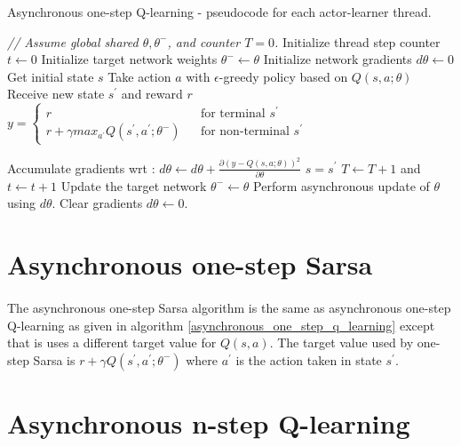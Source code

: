 \documentclass[12pt,a4paper]{article}
\begin{document}
\begin{algorithm} 
	\caption{Asynchronous one-step Q-learning - pseudocode for each actor-learner thread.}
	\label{asynchronous_one_step_q_learning}
	\begin{algorithmic}[1]
		\State \textit{// Assume global shared $\theta, \theta^{-}$, and counter $T = 0$.}
		\State Initialize thread step counter $t \leftarrow 0$
		\State Initialize target network weights $\theta^{-} \leftarrow \theta$
		\State Initialize network gradients $d\theta \leftarrow 0$
		\State Get initial state $s$
		\Repeat
			\State Take action $a$ with $\epsilon$-greedy policy based on $Q(s, a; \theta)$
			\State Receive new state $s^{'}$ and reward $r$
			\State $y = \left\lbrace
				\begin{array}{lcl}
					r & & \text{for terminal }s^{'} \\
					r + \gamma max_{a^{'}}Q(s^{'}, a^{'}; \theta^{-}) & & \text{for non-terminal }s^{'}
				\end{array}	\right.$						
			
			\State Accumulate gradients wrt : $d\theta \leftarrow d\theta + \frac{\partial(y - Q(s, a; \theta))^{2}}{\partial\theta}$
			\State $s = s^{'}$
			\State $T \leftarrow T + 1$ and $t \leftarrow t + 1$
				\State Update the target network $\theta^{-} \leftarrow \theta$
			\EndIf
				\State Perform asynchronous update of $\theta$ using $d\theta$.
				\State Clear gradients $d\theta \leftarrow 0$.
			\EndIf
	\end{algorithmic}
\end{algorithm}

\section{Asynchronous one-step Sarsa}
\paragraph{}The asynchronous one-step Sarsa algorithm is the same as asynchronous one-step Q-learning as given in algorithm {\ref{asynchronous_one_step_q_learning}} except that is uses a different target value for $Q(s, a)$. The target value used by one-step Sarsa is $r + \gamma Q(s^{'}, a^{'}; \theta^{-})$ where $a^{'}$ is the action taken in state $s^{'}$.



\section{Asynchronous n-step Q-learning}
\end{document}
